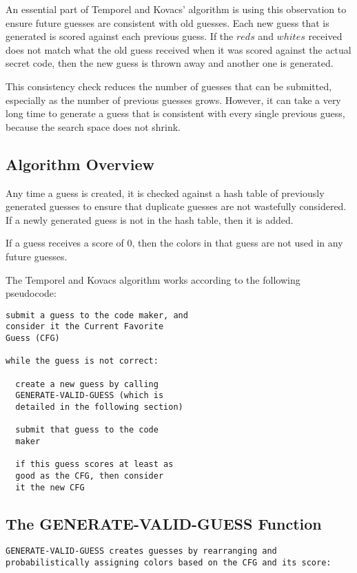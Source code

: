 \documentclass[11pt,twocolumn]{article}
\begin{document}
An essential part of Temporel and Kovacs' algorithm is using this observation to ensure future guesses are consistent with old guesses. Each new guess that is generated is scored against each previous guess. If the $reds$ and $whites$ received does not match what the old guess received when it was scored against the actual secret code, then the new guess is thrown away and another one is generated.

This consistency check reduces the number of guesses that can be submitted, especially as the number of previous guesses grows. However, it can take a very long time to generate a guess that is consistent with every single previous guess, because the search space does not shrink.

\subsection{Algorithm Overview}

Any time a guess is created, it is checked against a hash table of previously generated guesses to ensure that duplicate guesses are not wastefully considered. If a newly generated guess is not in the hash table, then it is added.

If a guess receives a score of 0, then the colors in that guess are not used in any future guesses. 

The Temporel and Kovacs algorithm works according to the following pseudocode: 

\begin{verbatim}
submit a guess to the code maker, and 
consider it the Current Favorite 
Guess (CFG)

while the guess is not correct:

  create a new guess by calling 
  GENERATE-VALID-GUESS (which is 
  detailed in the following section)

  submit that guess to the code
  maker
   
  if this guess scores at least as
  good as the CFG, then consider
  it the new CFG   
\end{verbatim}

\subsection{The GENERATE-VALID-GUESS Function}

\tt GENERATE-VALID-GUESS \rm creates guesses by rearranging and probabilistically assigning colors based on the CFG and its score:
\end{document}
